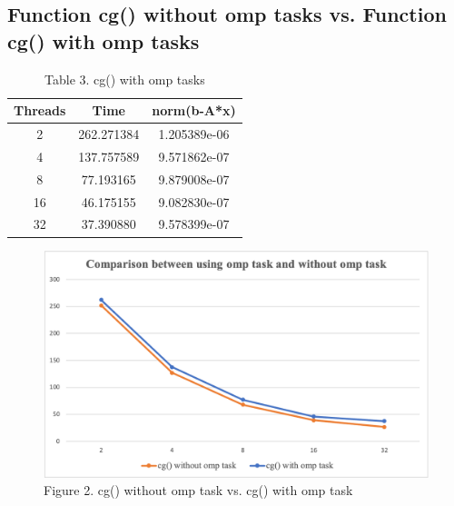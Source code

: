 \documentclass[a4paper,11pt,BCOR10mm,oneside,headsepline]{scrartcl}
\begin{document}
	\subsection{Function cg() without omp tasks vs. Function cg() with omp tasks}
	\begin{table}[!htbp]
		\centering
		\begin{tabular}{|c|c|c|}
			\hline
			\textbf{Threads} & \textbf{Time} & \textbf{norm(b-A*x)} \\ \hline
			2                & 262.271384    & 1.205389e-06         \\ \hline
			4                & 137.757589    & 9.571862e-07         \\ \hline
			8                & 77.193165     & 9.879008e-07         \\ \hline
			16               & 46.175155     & 9.082830e-07         \\ \hline
			32               & 37.390880     & 9.578399e-07         \\ \hline
		\end{tabular}
		\caption*{Table 3. cg() with omp tasks}
	\end{table}

	\begin{figure}[!htbp]
		\centering
		\includegraphics[scale=0.5]{plot2}
		\caption*{Figure 2. cg() without omp task vs. cg() with omp task}
	\end{figure}
\end{document}
